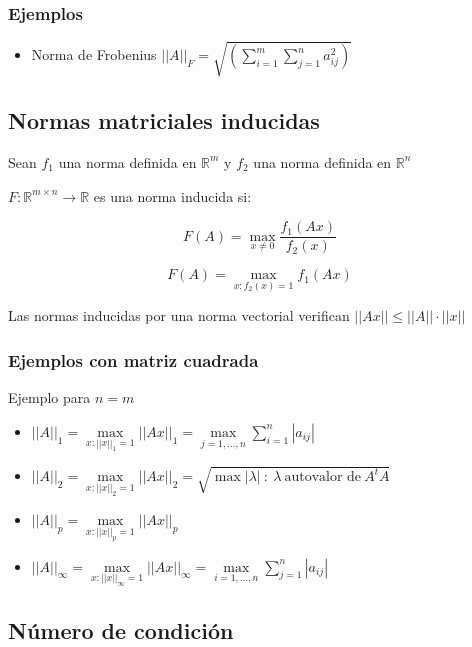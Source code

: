 \subsubsection{Ejemplos}\label{subsubsec:normas_matriciales_ejemplos}

\begin{itemize}
    \item Norma de Frobenius ${||A||}_{F} = \sqrt{(\sum_{i=1}^{m}\sum_{j=1}^{n}a_{ij}^{2})}$
\end{itemize}

\subsection{Normas matriciales inducidas}\label{subsec:normas_matriciales_inducidas}

Sean $f_1$ una norma definida en $\mathbb{R}^{m}$ y $f_2$ una norma definida en $\mathbb{R}^{n}$

$F:\mathbb{R}^{m\times n}\to\mathbb{R}$ es una norma inducida si:

\[F(A) = \max_{x\neq 0}\frac{f_1 (Ax)}{f_2 (x)}\]

\[F(A) = \max_{x:f_2 (x) = 1} f_1 (Ax)\]

\noindent Las normas inducidas por una norma vectorial verifican $||Ax|| \leq ||A||\cdot||x||$

\subsubsection{Ejemplos con matriz cuadrada}\label{subsubsec:normas_matriciales_inducidas_ejemplos}

Ejemplo para $n=m$

\begin{itemize}
    \item ${||A||}_1 = \underset{x:{||x||}_1 = 1}{\max} {||Ax||}_1 = \underset{j=1,\ldots,n}{\max}\sum_{i=1}^{n}|a_{ij}|$
    \item ${||A||}_2 = \underset{x:{||x||}_2 = 1}{\max} {||Ax||}_2 = \sqrt{\max |\lambda|~:~\lambda~\text{autovalor de}~A^{t}A}$
    \item ${||A||}_p = \underset{x:{||x||}_p = 1}{\max} {||Ax||}_p$
    \item ${||A||}_{\infty} = \underset{x:{||x||}_{\infty} = 1}{\max} {||Ax||}_{\infty} = \underset{i=1,\ldots,n}{\max}\sum_{j=1}^{n}|a_{ij}|$
\end{itemize}

\subsection{Número de condición}\label{subsec:numero_de_condicion}

